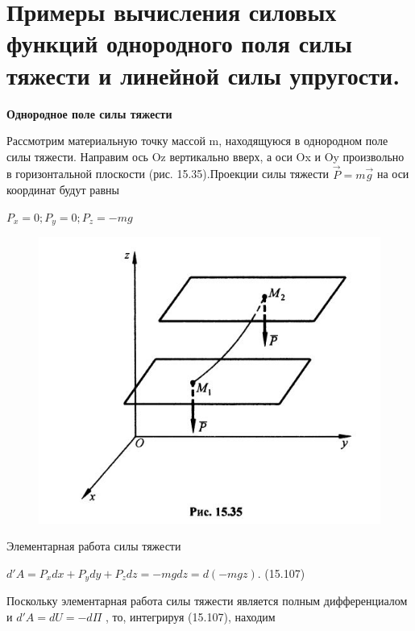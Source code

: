 {\section{Примеры вычисления силовых функций однородного поля силы тяжести и линейной силы упругости.}
\begin{center}
    \par \textbf{Однородное поле силы тяжести}

    \par Рассмотрим материальную точку массой m, находящуюся в однородном поле силы тяжести. Направим ось Oz вертикально вверх, а оси Ox и Oy произвольно в горизонтальной плоскости (рис. 15.35).Проекции силы тяжести $\vec{P} = m\vec{g}$  на оси координат будут равны

    \par $P_{x} =0;P_{y} =0;P_{z} = -mg$
    
    \begin{figure}[H]
    \centering\includegraphics[scale=0.5]{img/15.35.JPG} 
    \end{figure}

    \par Элементарная работа силы тяжести

    \par $d'A = P_{x}dx + P_{y}dy + P_{z}dz = -mgdz = d(-mgz). $ \qquad (15.107)
   
    \par Поскольку элементарная работа силы тяжести является полным дифференциалом и $ d'A = dU=-d\Pi$ , то, интегрируя (15.107), находим


\end{center}}
